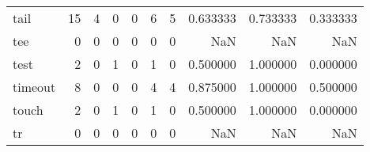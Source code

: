 \begin{longtable}{lrrrrrrrrr}
tail      &                                                 15 &                                                  4 &                                                  0 &                                                  0 &                                                  6 &                                                  5 &                                           0.633333 &                               0.733333 &                             0.333333 \\
tee       &                                                  0 &                                                  0 &                                                  0 &                                                  0 &                                                  0 &                                                  0 &                                                NaN &                                    NaN &                                  NaN \\
test      &                                                  2 &                                                  0 &                                                  1 &                                                  0 &                                                  1 &                                                  0 &                                           0.500000 &                               1.000000 &                             0.000000 \\
timeout   &                                                  8 &                                                  0 &                                                  0 &                                                  0 &                                                  4 &                                                  4 &                                           0.875000 &                               1.000000 &                             0.500000 \\
touch     &                                                  2 &                                                  0 &                                                  1 &                                                  0 &                                                  1 &                                                  0 &                                           0.500000 &                               1.000000 &                             0.000000 \\
tr        &                                                  0 &                                                  0 &                                                  0 &                                                  0 &                                                  0 &                                                  0 &                                                NaN &                                    NaN &                                  NaN \\

\end{longtable}
